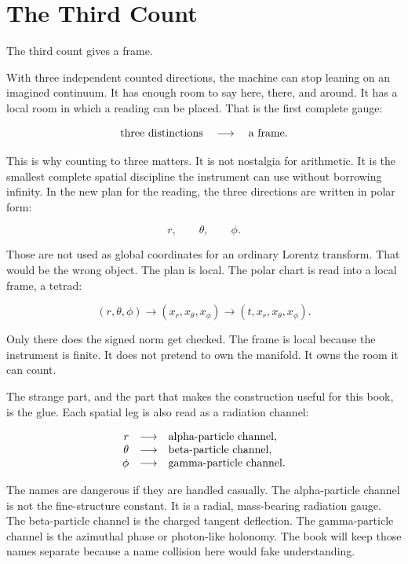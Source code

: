 \section*{The Third Count}

The third count gives a frame.

With three independent counted directions, the machine can stop leaning
on an imagined continuum. It has enough room to say here, there, and
around. It has a local room in which a reading can be placed. That is
the first complete gauge:

\[
\hbox{three distinctions}\quad\longrightarrow\quad\hbox{a frame}.
\]

This is why counting to three matters. It is not nostalgia for
arithmetic. It is the smallest complete spatial discipline the
instrument can use without borrowing infinity. In the new plan for the
reading, the three directions are written in polar form:

\[
r,\qquad \theta,\qquad \phi .
\]

Those are not used as global coordinates for an ordinary Lorentz
transform. That would be the wrong object. The plan is local. The polar
chart is read into a local frame, a tetrad:

\[
(r,\theta,\phi)
   \longrightarrow (x_r,x_\theta,x_\phi)
   \longrightarrow (t,x_r,x_\theta,x_\phi).
\]

Only there does the signed norm get checked. The frame is local because
the instrument is finite. It does not pretend to own the manifold. It
owns the room it can count.

The strange part, and the part that makes the construction useful for
this book, is the glue. Each spatial leg is also read as a radiation
channel:

\[
\begin{array}{rcl}
r      &\longrightarrow& \hbox{alpha-particle channel},\\
\theta &\longrightarrow& \hbox{beta-particle channel},\\
\phi   &\longrightarrow& \hbox{gamma-particle channel}.
\end{array}
\]

The names are dangerous if they are handled casually. The
alpha-particle channel is not the fine-structure constant. It is a
radial, mass-bearing radiation gauge. The beta-particle channel is the
charged tangent deflection. The gamma-particle channel is the azimuthal
phase or photon-like holonomy. The book will keep those names separate
because a name collision here would fake understanding.


